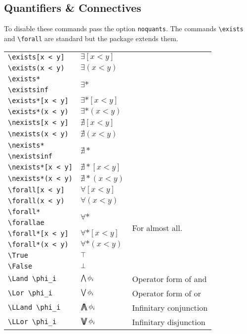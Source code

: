 \documentclass[leqno,11pt]{amsart}
\newcommand{\tab}{\hspace{1cm}}
\begin{document}
\subsection{Quantifiers \& Connectives}
To disable these commands pass the option \verb=noquants=. The commands \verb=\exists= and \verb=\forall= are standard but the package extends them.\\

\begin{tabular}{l |  l | l}\toprule
	\verb=\exists[x < y]=		& \( \exists[x < y ] \) & \\[6pt]
	\verb=\exists(x < y)=		& \( \exists(x < y ) \) & \\ \midrule
	\verb=\exists*=		& \multirow{2}{*}{\( \exists* \)} & \\[6pt]
	\tab \verb=\existsinf=	&				  & \\[6pt]
	\verb=\exists*[x < y]=		& \( \exists*[x < y ] \) & \\[6pt]
	\verb=\exists*(x < y)=		& \( \exists*(x < y ) \) & \\ \midrule
	\verb=\nexists[x < y]=		& \( \nexists[x < y ] \) & \\[6pt]
	\verb=\nexists(x < y)=		& \( \nexists(x < y ) \) & \\ \midrule
	\verb=\nexists*=		& \multirow{2}{*}{\( \nexists* \)} & \\[6pt]
	\tab \verb=\nexistsinf=	&				  & \\[6pt]
	\verb=\nexists*[x < y]=		& \( \nexists*[x < y ] \) & \\[6pt]
	\verb=\nexists*(x < y)=		& \( \nexists*(x < y ) \) & \\ \midrule
	\verb=\forall[x < y]=		& \( \forall[x < y ] \) & \\[6pt]
	\tab \verb=\forall(x < y)=		& \( \forall(x < y ) \) & \\ \midrule
	\verb=\forall*=		& \multirow{2}{*}{\( \forall* \)} &\multirow{4}{*}{For almost all.} \\
	\tab \verb=\forallae=	&				  & \\[6pt]
	\verb=\forall*[x < y]=		& \( \forall*[x < y ] \) & \\[6pt]
	\verb=\forall*(x < y)=		& \( \forall*(x < y ) \) & \\ \midrule
	\verb=\True=				& \( \top \) & \\ \midrule
	\verb=\False=				& \( \bot \) & \\ \midrule
	\verb=\Land \phi_i=				& \( \mathop{\bigwedge} \phi_i \) & Operator form of and\\ \midrule
	\verb=\Lor \phi_i=				& \( \mathop{\bigvee} \phi_i \) & Operator form of or\\ \midrule
	\verb=\LLand \phi_i=				& \( \mathop{\bigwedge\mkern-15mu\bigwedge} \phi_i \) & Infinitary conjunction\\ \midrule
	\verb=\LLor \phi_i=				& \( \mathop{\bigvee\mkern-15mu\bigvee} \phi_i \) & Infinitary disjunction\\
	\bottomrule
\end{tabular}
\end{document}
